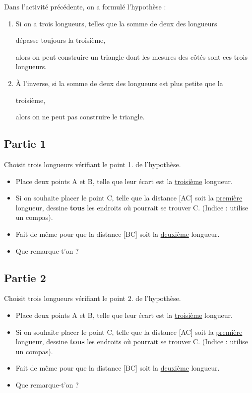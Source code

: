 \documentclass[a4paper,12pt]{article}
\newcommand{\correction}[1]{{\color{red}#1}}
\newcommand{\correction}[1]{\dotfill}
\begin{document}
\maketitle

Dans l'activité précédente, on a formulé l'hypothèse :

\begin{hypothese}
	\begin{enumerate}
		\item Si on a trois longueurs, telles que \correction{la somme de deux des longueurs}

		      \correction{dépasse toujours la troisième},

		      alors on peut construire un triangle dont les mesures des côtés sont ces trois longueurs.
		\item À l'inverse, si \correction{la somme de deux des longueurs est plus petite que la}

		      \correction{troisième},

		      alors on ne peut pas construire le triangle.
	\end{enumerate}
\end{hypothese}


\subsection*{Partie 1}

Choisit trois longueurs vérifiant le point 1. de l'hypothèse.

\begin{itemize}
	\item Place deux points A et B, telle que leur écart est la \uline{troisième} longueur.
	\item Si on souhaite placer le point C, telle que la distance [AC] soit la \uline{première} longueur, dessine \textbf{tous} les endroits où pourrait se trouver C. (Indice : utilise un compas).
	\item Fait de même pour que la distance [BC] soit la \uline{deuxième} longueur.
	\item Que remarque-t'on ?
\end{itemize}

\subsection*{Partie 2}

Choisit trois longueurs vérifiant le point 2. de l'hypothèse.

\begin{itemize}
	\item Place deux points A et B, telle que leur écart est la \uline{troisième} longueur.
	\item Si on souhaite placer le point C, telle que la distance [AC] soit la \uline{première} longueur, dessine \textbf{tous} les endroits où pourrait se trouver C. (Indice : utilise un compas).
	\item Fait de même pour que la distance [BC] soit la \uline{deuxième} longueur.
	\item Que remarque-t'on ?
\end{itemize}
\end{document}
